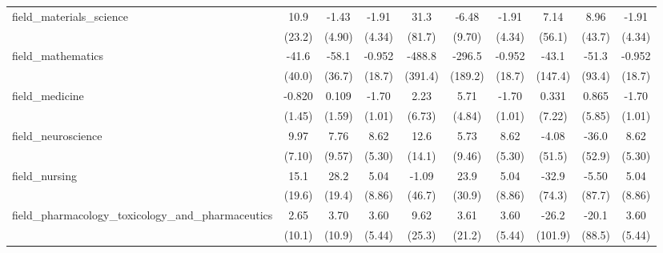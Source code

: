 \begin{tabular}{lccccccccc}
   field\_materials\_science                                   & 10.9          & -1.43         & -1.91         & 31.3           & -6.48         & -1.91         & 7.14    & 8.96      & -1.91\\   
                                                               & (23.2)        & (4.90)        & (4.34)        & (81.7)         & (9.70)        & (4.34)        & (56.1)  & (43.7)    & (4.34)\\   
   field\_mathematics                                          & -41.6         & -58.1         & -0.952        & -488.8         & -296.5        & -0.952        & -43.1   & -51.3     & -0.952\\   
                                                               & (40.0)        & (36.7)        & (18.7)        & (391.4)        & (189.2)       & (18.7)        & (147.4) & (93.4)    & (18.7)\\   
   field\_medicine                                             & -0.820        & 0.109         & -1.70         & 2.23           & 5.71          & -1.70         & 0.331   & 0.865     & -1.70\\   
                                                               & (1.45)        & (1.59)        & (1.01)        & (6.73)         & (4.84)        & (1.01)        & (7.22)  & (5.85)    & (1.01)\\   
   field\_neuroscience                                         & 9.97          & 7.76          & 8.62          & 12.6           & 5.73          & 8.62          & -4.08   & -36.0     & 8.62\\   
                                                               & (7.10)        & (9.57)        & (5.30)        & (14.1)         & (9.46)        & (5.30)        & (51.5)  & (52.9)    & (5.30)\\   
   field\_nursing                                              & 15.1          & 28.2          & 5.04          & -1.09          & 23.9          & 5.04          & -32.9   & -5.50     & 5.04\\   
                                                               & (19.6)        & (19.4)        & (8.86)        & (46.7)         & (30.9)        & (8.86)        & (74.3)  & (87.7)    & (8.86)\\   
   field\_pharmacology\_toxicology\_and\_pharmaceutics         & 2.65          & 3.70          & 3.60          & 9.62           & 3.61          & 3.60          & -26.2   & -20.1     & 3.60\\   
                                                               & (10.1)        & (10.9)        & (5.44)        & (25.3)         & (21.2)        & (5.44)        & (101.9) & (88.5)    & (5.44)\\   

\end{tabular}
